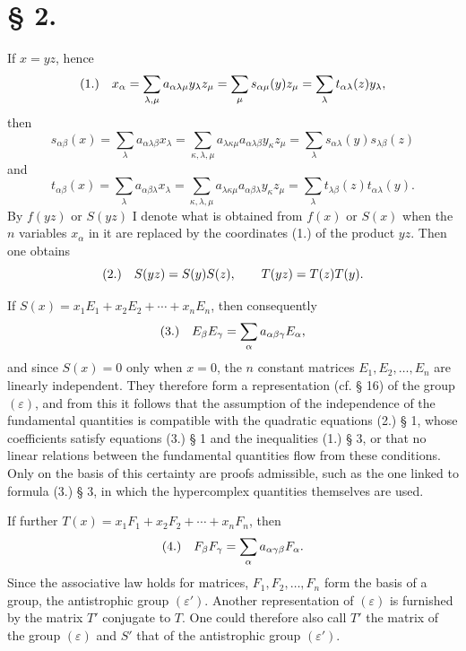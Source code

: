 \documentclass[11pt]{article}
\newcommand{\eps}{\varepsilon}
\newcommand{\fnum}[1]{\textup{(\ensuremath{#1}.)}\quad}
\begin{document}
\section*{§ 2.}

If $x=yz$, hence
\[
\fnum{1} x_\alpha=\sum_{\lambda,\mu}a_{\alpha\lambda\mu}y_\lambda z_\mu
=\sum_\mu s_{\alpha\mu}(y)z_\mu=\sum_\lambda t_{\alpha\lambda}(z)y_\lambda,
\]
then
\[
s_{\alpha\beta}(x)=\sum_\lambda a_{\alpha\lambda\beta}x_\lambda
 =\sum_{\kappa,\lambda,\mu}a_{\lambda\kappa\mu}a_{\alpha\lambda\beta}y_\kappa z_\mu
 =\sum_\lambda s_{\alpha\lambda}(y)s_{\lambda\beta}(z)
\]
and
\[
t_{\alpha\beta}(x)=\sum_\lambda a_{\alpha\beta\lambda}x_\lambda
 =\sum_{\kappa,\lambda,\mu}a_{\lambda\kappa\mu}a_{\alpha\beta\lambda}y_\kappa z_\mu
 =\sum_\lambda t_{\lambda\beta}(z)t_{\alpha\lambda}(y).
\]
By $f(yz)$ or $S(yz)$ I denote what is obtained from $f(x)$ or $S(x)$ when the $n$ variables $x_\alpha$ in it are replaced by the coordinates (1.) of the product $yz$. Then one obtains
\[
\fnum{2} S(yz)=S(y)S(z),\qquad T(yz)=T(z)T(y).
\]

If $S(x)=x_1E_1+x_2E_2+\cdots+x_nE_n$, then consequently
\[
\fnum{3} E_\beta E_\gamma=\sum_\alpha a_{\alpha\beta\gamma}E_\alpha,
\]
and since $S(x)=0$ only when $x=0$, the $n$ constant matrices $E_1,E_2,\ldots,E_n$ are linearly independent. They therefore form a representation (cf. § 16) of the group $(\eps)$, and from this it follows that the assumption of the independence of the fundamental quantities is compatible with the quadratic equations (2.) § 1, whose coefficients satisfy equations (3.) § 1 and the inequalities (1.) § 3, or that no linear relations between the fundamental quantities flow from these conditions. Only on the basis of this certainty are proofs admissible, such as the one linked to formula (3.) § 3, in which the hypercomplex quantities themselves are used.

If further $T(x)=x_1F_1+x_2F_2+\cdots+x_nF_n$, then
\[
\fnum{4} F_\beta F_\gamma=\sum_\alpha a_{\alpha\gamma\beta}F_\alpha.
\]
Since the associative law holds for matrices, $F_1,F_2,\ldots,F_n$ form the basis of a group, the antistrophic group $(\eps')$. Another representation of $(\eps)$ is furnished by the matrix $T'$ conjugate to $T$. One could therefore also call $T'$ the matrix of the group $(\eps)$ and $S'$ that of the antistrophic group $(\eps')$.
\end{document}
